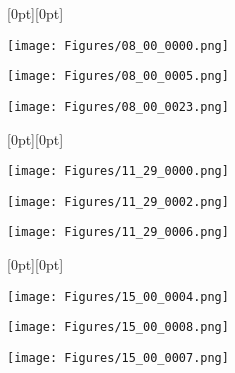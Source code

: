 \begin{figure}
\begin{minipage}[b]{0.01\linewidth}
    \raisebox{2em}[0pt][0pt]{} %
\end{minipage}
\begin{minipage}[b]{0.25\linewidth}
    \centering
    \texttt{[image: Figures/08\_00\_0000.png]}
\end{minipage}
\begin{minipage}[b]{0.25\linewidth}
    \centering
    \texttt{[image: Figures/08\_00\_0005.png]}
\end{minipage}
\begin{minipage}[b]{0.25\linewidth}
    \centering
    \texttt{[image: Figures/08\_00\_0023.png]}
\end{minipage}

\begin{minipage}[b]{0.01\linewidth}
    \raisebox{2em}[0pt][0pt]{} %
\end{minipage}
\begin{minipage}[b]{0.25\linewidth}
    \centering
    \texttt{[image: Figures/11\_29\_0000.png]}
\end{minipage}
\begin{minipage}[b]{0.25\linewidth}
    \centering
    \texttt{[image: Figures/11\_29\_0002.png]}
\end{minipage}
\begin{minipage}[b]{0.25\linewidth}
    \centering
    \texttt{[image: Figures/11\_29\_0006.png]}
\end{minipage}

\begin{minipage}[b]{0.01\linewidth}
    \raisebox{2em}[0pt][0pt]{} %
\end{minipage}
\begin{minipage}[b]{0.25\linewidth}
    \centering
    \texttt{[image: Figures/15\_00\_0004.png]}
\end{minipage}
\begin{minipage}[b]{0.25\linewidth}
    \centering
    \texttt{[image: Figures/15\_00\_0008.png]}
\end{minipage}
\begin{minipage}[b]{0.25\linewidth}
    \centering
    \texttt{[image: Figures/15\_00\_0007.png]}
\end{minipage}


\end{figure}
